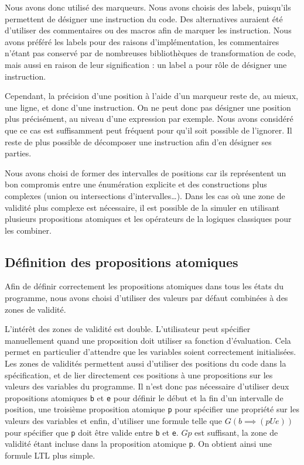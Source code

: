 Nous avons donc utilisé des marqueurs. Nous avons choisis des labels, puisqu'ils
permettent de désigner une instruction du code. Des alternatives auraient été
d'utiliser des commentaires ou des macros afin de marquer les instruction. Nous
avons préféré les labels pour des raisons d'implémentation, les commentaires
n'étant pas conservé par de nombreuses bibliothèques de transformation de code,
mais aussi en raison de leur signification : un label a pour rôle de désigner
une instruction.

Cependant, la précision d'une position à l'aide d'un marqueur reste de, au
mieux, une ligne, et donc d'une instruction. On ne peut donc pas désigner une
position plus précisément, au niveau d'une expression par exemple. Nous avons
considéré que ce cas est suffisamment peut fréquent pour qu'il soit possible de
l'ignorer. Il reste de plus possible de décomposer une instruction afin d'en
désigner ses parties.

Nous avons choisi de former des intervalles de positions car ils représentent un
bon compromis entre une énumération explicite et des constructions plus
complexes (union ou intersections d'intervalles\ldots{}). Dans les cas où une
zone de validité plus complexe est nécessaire, il est possible de la simuler en
utilisant plusieurs propositions atomiques et les opérateurs de la logiques
classiques pour les combiner.

\subsection{Définition des propositions atomiques}

Afin de définir correctement les propositions atomiques dans tous les
états du programme, nous avons choisi d'utiliser des valeurs par défaut
combinées à des zones de validité.

L'intérêt des zones de validité est double. L'utilisateur peut spécifier
manuellement quand une proposition doit utiliser sa fonction d'évaluation. Cela
permet en particulier d'attendre que les variables soient correctement
initialisées. Les zones de validités permettent aussi d'utiliser des positions
du code dans la spécification, et de lier directement ces positions à une
propositions sur les valeurs des variables du programme. Il n'est donc pas
nécessaire d'utiliser deux propositions atomiques \texttt{b} et \texttt{e} pour
définir le début et la fin d'un intervalle de position, une troisième
proposition atomique \texttt{p} pour spécifier une propriété sur les valeurs des
variables et enfin, d'utiliser une formule telle que \(G (b \implies (p U e))\)
pour spécifier que \texttt{p} doit être valide entre \texttt{b} et \texttt{e}.
\(G p\) est suffisant, la zone de validité étant incluse dans la proposition
atomique \texttt{p}. On obtient ainsi une formule LTL plus simple.

